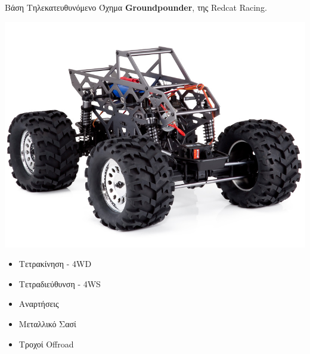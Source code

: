 \documentclass[10pt, compress, handout]{beamer} %
\begin{document}
\begin{frame}{Βάση}
	Τηλεκατευθυνόμενο Όχημα \textbf{Groundpounder}, της Redcat Racing.\\[1cm]
	
	\begin{minipage}{0.55\textwidth}
		\includegraphics[width=\textwidth]{Figures/groundpounder.jpg}
	\end{minipage}
	\begin{minipage}{0.4\textwidth}
		\begin{itemize}
			\item Τετρακίνηση - 4WD
			\item Τετραδιεύθυνση - 4WS
			\item Αναρτήσεις
			\item Μεταλλικό Σασί
			\item Τροχοί Offroad
		\end{itemize}
	\end{minipage}
	
\end{frame}
\end{document}
